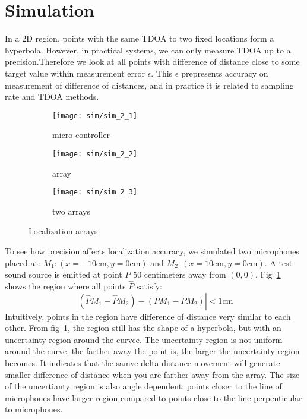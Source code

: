 \section{Simulation}
In a 2D region, points with the same TDOA to two fixed locations form a hyperbola. However, in practical systems, we can only measure TDOA up to a precision.Therefore we look at all points with difference of distance close to some target value within measurement error $\epsilon$. This $\epsilon$ prepresents accuracy on measurement of difference of distances, and in practice it is related to sampling rate and TDOA methods.

\begin{figure}[]
  \centering
  \begin{subfigure}[]{.23\textwidth}
    \texttt{[image: sim/sim\_2\_1]}
    \caption{micro-controller}
  \end{subfigure}
  \begin{subfigure}[]{.23\textwidth}
    \texttt{[image: sim/sim\_2\_2]}
    \caption{array}
  \end{subfigure}
  \begin{subfigure}[]{.23\textwidth}
    \texttt{[image: sim/sim\_2\_3]}
    \caption{two arrays}
  \end{subfigure}
  \caption{Localization arrays}
  \label{fig:sim_2_5}
\end{figure}

To see how precision affects localization accuracy, we simulated two microphones placed at: $M_1:(x=-10\mbox{cm},y=0\mbox{cm})$ and $M_2:(x=10\mbox{cm},y=0\mbox{cm})$. A test sound source is emitted at point $P$ $50$ centimeters away from $(0,0)$. Fig~\ref{fig:sim_2_5} shows the region where all points $\hat P$ satisfy:
\[
 |(\hat P M_1 - \hat P M_2) - (P M_1 - P M_2)| < 1 \mbox{cm}
\]
Intuitively, points in the region have difference of distance very similar to each other. From fig~\ref{fig:sim_2_5}, the region still has the shape of a hyperbola, but with an uncertainty region around the curvce. The uncertainty region is not uniform around the curve, the farther away the point is, the larger the uncertainty region becomes. It indicates that the samve delta distance movement will generate smaller difference of distance when you are farther away from the array. The size of the uncertianty region is also angle dependent: points closer to the line of microphones have larger region compared to points close to the line perpenticular to microphones. 

